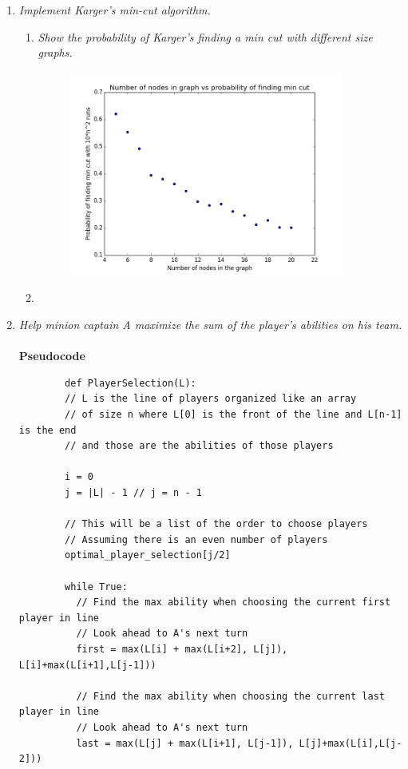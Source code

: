 \documentclass[12pt]{article}
\begin{document}
\begin{enumerate}
		\newpage
		\item \textit{Implement Karger's min-cut algorithm.}\\
    \begin{enumerate}
    \item \textit{Show the probability of Karger's finding a min cut with different size graphs.}\\
          \begin{figure}[H]
		      \centering
			    \includegraphics[width=9cm]{q3_5a.png}
			    \end{figure}
    \item
    \end{enumerate}

		\newpage
		\item \textit{Help minion captain A maximize the sum of the player's abilities on his team.}\\
		\\
		\textbf{Pseudocode}
		\begin{verbatim}
		def PlayerSelection(L):
		// L is the line of players organized like an array
		// of size n where L[0] is the front of the line and L[n-1] is the end
		// and those are the abilities of those players

		i = 0
		j = |L| - 1 // j = n - 1

		// This will be a list of the order to choose players
		// Assuming there is an even number of players
		optimal_player_selection[j/2] 

		while True:
		  // Find the max ability when choosing the current first player in line
		  // Look ahead to A's next turn
		  first = max(L[i] + max(L[i+2], L[j]), L[i]+max(L[i+1],L[j-1]))

		  // Find the max ability when choosing the current last player in line
		  // Look ahead to A's next turn
		  last = max(L[j] + max(L[i+1], L[j-1]), L[j]+max(L[i],L[j-2]))


\end{verbatim}
\end{enumerate}
\end{document}
